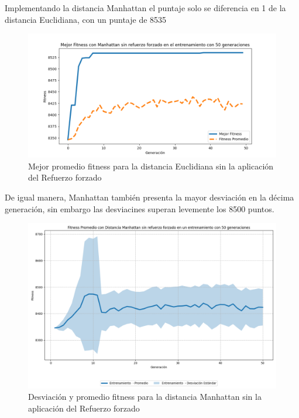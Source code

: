 \documentclass[conference]{IEEEtran}
\begin{document}
Implementando la distancia Manhattan el puntaje solo se diferencia en 1 de la distancia Euclidiana, con un puntaje de 8535
\begin{figure}[H]
    \centering
    \includegraphics[width=0.9\linewidth]{Sin_Refuerzo_50Gen/Manh_NoRef_50Gen.png}
    \caption{Mejor promedio fitness para la distancia Euclidiana sin la aplicación del Refuerzo forzado}
    \label{fig:no_refoice_man}
\end{figure}
De igual manera, Manhattan también presenta la mayor desviación en la décima generación, sin embargo las desviacines superan levemente los 8500 puntos.
\begin{figure}[H]
    \centering
    \includegraphics[width=0.8\linewidth]{Sin_Refuerzo_50Gen/Manh_NoRef_50Gen_Sombra.png}
    \caption{Desviación y promedio fitness para la distancia Manhattan sin la aplicación del Refuerzo forzado}
    \label{fig:no_refoice_man_desv}
\end{figure}
\end{document}
